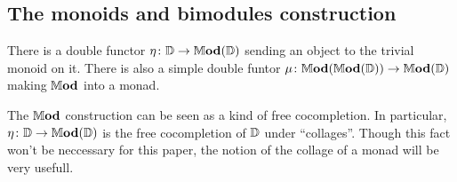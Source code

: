 \documentclass[12pt,oneside,article,draft]{memoir}
\begin{document}



\subsection{The monoids and bimodules construction}
There is a double functor $\eta\colon\mathbb{D}\to\mathbb{M}\mathbf{od}(\mathbb{D})$ sending an object to the trivial monoid on it. There is also a simple double funtor $\mu\colon\mathbb{M}\mathbf{od}(\mathbb{M}\mathbf{od}(\mathbb{D}))\to\mathbb{M}\mathbf{od}(\mathbb{D})$ making $\mathbb{M}\mathbf{od}$ into a monad.

The $\mathbb{M}\mathbf{od}$ construction can be seen as a kind of free cocompletion.
In particular, $\eta\colon\mathbb{D}\to\mathbb{M}\mathbf{od}(\mathbb{D})$ is the free cocompletion of $\mathbb{D}$ under ``collages''.
Though this fact won't be neccessary for this paper, the notion of the collage of a monad will be very usefull.
\end{document}
